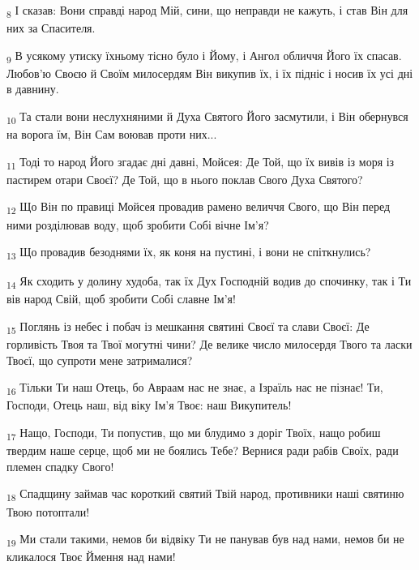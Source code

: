 \begin{tcolorbox}
\textsubscript{8} І сказав: Вони справді народ Мій, сини, що неправди не кажуть, і став Він для них за Спасителя.
\end{tcolorbox}
\begin{tcolorbox}
\textsubscript{9} В усякому утиску їхньому тісно було і Йому, і Ангол обличчя Його їх спасав. Любов'ю Своєю й Своїм милосердям Він викупив їх, і їх підніс і носив їх усі дні в давнину.
\end{tcolorbox}
\begin{tcolorbox}
\textsubscript{10} Та стали вони неслухняними й Духа Святого Його засмутили, і Він обернувся на ворога їм, Він Сам воював проти них...
\end{tcolorbox}
\begin{tcolorbox}
\textsubscript{11} Тоді то народ Його згадає дні давні, Мойсея: Де Той, що їх вивів із моря із пастирем отари Своєї? Де Той, що в нього поклав Свого Духа Святого?
\end{tcolorbox}
\begin{tcolorbox}
\textsubscript{12} Що Він по правиці Мойсея провадив рамено величчя Свого, що Він перед ними розділював воду, щоб зробити Собі вічне Ім'я?
\end{tcolorbox}
\begin{tcolorbox}
\textsubscript{13} Що провадив безоднями їх, як коня на пустині, і вони не спіткнулись?
\end{tcolorbox}
\begin{tcolorbox}
\textsubscript{14} Як сходить у долину худоба, так їх Дух Господній водив до спочинку, так і Ти вів народ Свій, щоб зробити Собі славне Ім'я!
\end{tcolorbox}
\begin{tcolorbox}
\textsubscript{15} Поглянь із небес і побач із мешкання святині Своєї та слави Своєї: Де горливість Твоя та Твої могутні чини? Де велике число милосердя Твого та ласки Твоєї, що супроти мене затрималися?
\end{tcolorbox}
\begin{tcolorbox}
\textsubscript{16} Тільки Ти наш Отець, бо Авраам нас не знає, а Ізраїль нас не пізнає! Ти, Господи, Отець наш, від віку Ім'я Твоє: наш Викупитель!
\end{tcolorbox}
\begin{tcolorbox}
\textsubscript{17} Нащо, Господи, Ти попустив, що ми блудимо з доріг Твоїх, нащо робиш твердим наше серце, щоб ми не боялись Тебе? Вернися ради рабів Своїх, ради племен спадку Свого!
\end{tcolorbox}
\begin{tcolorbox}
\textsubscript{18} Спадщину займав час короткий святий Твій народ, противники наші святиню Твою потоптали!
\end{tcolorbox}
\begin{tcolorbox}
\textsubscript{19} Ми стали такими, немов би відвіку Ти не панував був над нами, немов би не кликалося Твоє Ймення над нами!
\end{tcolorbox}
